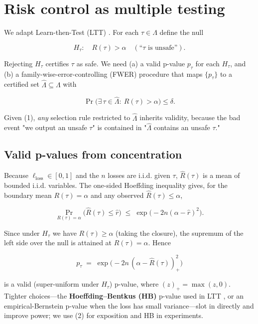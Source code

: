 \documentclass{ieeeaccess}
\begin{document}
\section{Risk control as multiple testing}

We adapt Learn-then-Test (LTT) \cite{angelopoulos2025learn}. For each $\tau\in\Lambda$ define the null

\[
H_\tau:\quad R(\tau)>\alpha \quad(\text{``}\tau\text{ is unsafe''}).
\]

Rejecting $H_\tau$ certifies $\tau$ as safe. We need (a) a valid p-value $p_\tau$ for each $H_\tau$, and (b) a family-wise-error-controlling (FWER) procedure that maps $\{p_\tau\}$ to a certified set $\hat\Lambda\subseteq\Lambda$ with

\begin{equation}
\Pr\big(\exists\,\tau\in\hat\Lambda:\ R(\tau)>\alpha\big)\le\delta.
\tag{1}
\end{equation}

Given (1), \emph{any} selection rule restricted to $\hat\Lambda$ inherits validity, because the bad event "we output an unsafe $\tau$" is contained in "$\hat\Lambda$ contains an unsafe $\tau$."

\subsection{Valid p-values from concentration}

Because $\ell_{\mathrm{loss}}\in[0,1]$ and the $n$ losses are i.i.d. given $\tau$, $\hat R(\tau)$ is a mean of bounded i.i.d. variables. The one-sided Hoeffding inequality \cite{hoeffding1963probability} gives, for the boundary mean $R(\tau)=\alpha$ and any observed $\hat R(\tau)\le\alpha$,

\[
\Pr_{R(\tau)=\alpha}\!\big(\hat R(\tau)\le \hat r\big)\;\le\;\exp\!\big(-2n(\alpha-\hat r)^2\big).
\]

Since under $H_\tau$ we have $R(\tau)\ge\alpha$ (taking the closure), the supremum of the left side over the null is attained at $R(\tau)=\alpha$. Hence

\begin{equation}
\boxed{\,p_\tau \;=\; \exp\!\big(-2n\,(\alpha-\hat R(\tau))_+^2\big)\,}
\tag{2}
\end{equation}

is a valid (super-uniform under $H_\tau$) p-value, where $(z)_+=\max(z,0)$. Tighter choices---the \textbf{Hoeffding--Bentkus (HB)} p-value used in LTT \cite{angelopoulos2025learn,bentkus2004hoeffding}, or an empirical-Bernstein p-value \cite{maurer2009empirical} when the loss has small variance---slot in directly and improve power; we use (2) for exposition and HB in experiments.
\end{document}
